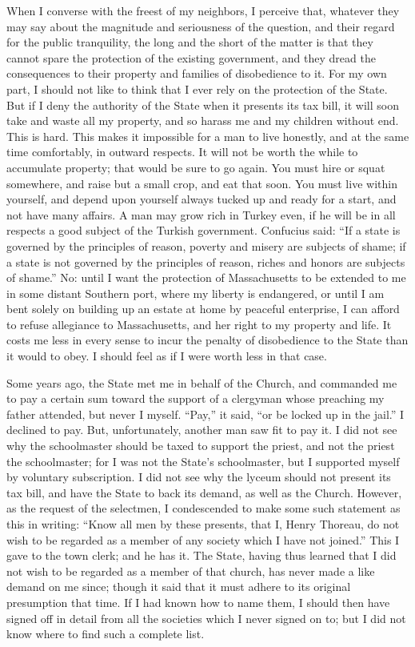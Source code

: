 \documentclass[letterpaper,12pt]{article}
\begin{document}
When I converse with the freest of my neighbors, I perceive that, whatever they
may say about the magnitude and seriousness of the question, and their regard
for the public tranquility, the long and the short of the matter is that they
cannot spare the protection of the existing government, and they dread the
consequences to their property and families of disobedience to it. For my own
part, I should not like to think that I ever rely on the protection of the
State. But if I deny the authority of the State when it presents its tax bill,
it will soon take and waste all my property, and so harass me and my children
without end. This is hard. This makes it impossible for a man to live honestly,
and at the same time comfortably, in outward respects. It will not be worth the
while to accumulate property; that would be sure to go again. You must hire or
squat somewhere, and raise but a small crop, and eat that soon. You must live
within yourself, and depend upon yourself always tucked up and ready for
a start, and not have many affairs. A man may grow rich in Turkey even, if he
will be in all respects a good subject of the Turkish government.  Confucius
said: \enquote{If a state is governed by the principles of reason, poverty and
    misery are subjects of shame; if a state is not governed by the principles
    of reason, riches and honors are subjects of shame.} No: until I want the
protection of Massachusetts to be extended to me in some distant Southern port,
where my liberty is endangered, or until I am bent solely on building up an
estate at home by peaceful enterprise, I can afford to refuse allegiance to
Massachusetts, and her right to my property and life. It costs me less in every
sense to incur the penalty of disobedience to the State than it would to obey.
I should feel as if I were worth less in that case.

Some years ago, the State met me in behalf of the Church, and commanded me to
pay a certain sum toward the support of a clergyman whose preaching my father
attended, but never I myself.  \enquote{Pay,} it said, \enquote{or be locked up
    in the jail.} I declined to pay.    But, unfortunately, another man saw fit
to pay it.  I did not see why the schoolmaster should be taxed to support the
priest, and not the priest the schoolmaster; for I was not the State's
schoolmaster, but I supported myself by voluntary subscription.  I did not see
why the lyceum should not present its tax bill, and have the State to back its
demand, as well as the Church.  However, as the request of the selectmen,
I condescended to make some such statement as this in writing: \enquote{Know all
    men by these presents, that I, Henry Thoreau, do not wish to be regarded as
    a member of any society which I have not joined.} This I gave to the town
clerk; and he has it. The State, having thus learned that I did not wish to be
regarded as a member of that church, has never made a like demand on me since;
though it said that it must adhere to its original presumption that time. If
I had known how to name them, I should then have signed off in detail from all
the societies which I never signed on to; but I did not know where to find such
a complete list.
\end{document}
